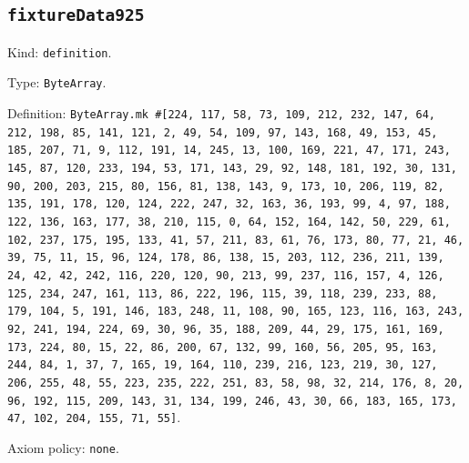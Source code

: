 \documentclass[11pt]{article}
\begin{document}
\subsection*{\texttt{fixtureData925}}
\noindent Kind: \texttt{definition}.\par
\noindent Type: \texttt{ByteArray}.\par
\noindent Definition: \texttt{ByteArray.mk \#[224, 117, 58, 73, 109, 212, 232, 147, 64, 212, 198, 85, 141, 121, 2, 49, 54, 109, 97, 143, 168, 49, 153, 45, 185, 207, 71, 9, 112, 191, 14, 245, 13, 100, 169, 221, 47, 171, 243, 145, 87, 120, 233, 194, 53, 171, 143, 29, 92, 148, 181, 192, 30, 131, 90, 200, 203, 215, 80, 156, 81, 138, 143, 9, 173, 10, 206, 119, 82, 135, 191, 178, 120, 124, 222, 247, 32, 163, 36, 193, 99, 4, 97, 188, 122, 136, 163, 177, 38, 210, 115, 0, 64, 152, 164, 142, 50, 229, 61, 102, 237, 175, 195, 133, 41, 57, 211, 83, 61, 76, 173, 80, 77, 21, 46, 39, 75, 11, 15, 96, 124, 178, 86, 138, 15, 203, 112, 236, 211, 139, 24, 42, 42, 242, 116, 220, 120, 90, 213, 99, 237, 116, 157, 4, 126, 125, 234, 247, 161, 113, 86, 222, 196, 115, 39, 118, 239, 233, 88, 179, 104, 5, 191, 146, 183, 248, 11, 108, 90, 165, 123, 116, 163, 243, 92, 241, 194, 224, 69, 30, 96, 35, 188, 209, 44, 29, 175, 161, 169, 173, 224, 80, 15, 22, 86, 200, 67, 132, 99, 160, 56, 205, 95, 163, 244, 84, 1, 37, 7, 165, 19, 164, 110, 239, 216, 123, 219, 30, 127, 206, 255, 48, 55, 223, 235, 222, 251, 83, 58, 98, 32, 214, 176, 8, 20, 96, 192, 115, 209, 143, 31, 134, 199, 246, 43, 30, 66, 183, 165, 173, 47, 102, 204, 155, 71, 55]}.\par
\noindent Axiom policy: \texttt{none}.\par
\end{document}

